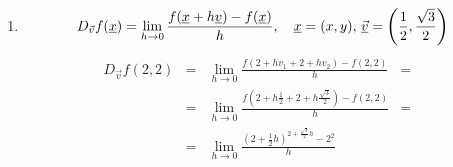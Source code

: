 \begin{example}
\begin{enumerate}
		\paragraph{Intermezzo:} Vedere Proposizione \ref{prop:f_diff_continua}. Se una funzione è differenziabile allora esiste una formula esplicita che permette di calcolare la derivata direzionale. $\qed$.
		\item
		\begin{equation*}
			D_{\vec v} f(\uline x) = \lim_{h\rightarrow 0}\frac{f(\uline x + h \uline v) - f(\uline x)}{h},\quad \uline x=(x,y),\, \uline{\vec v} = \left(\frac{1}{2}, \frac{\sqrt{3}}{2}\right)
		\end{equation*}
		\begin{equation}\label{eq:esempio_derivata_direzionale_2,2}
			\begin{matrix}
				D_{\vec v} f(2,2) &=& \lim\limits_{h\rightarrow 0}\frac{f(2+hv_1 + 2+hv_2) - f(2,2)}{h} &=& \\
				&=&\lim\limits_{h\rightarrow 0}\frac{f(2+h\frac{1}{2} + 2+h\frac{\sqrt3}{2}) - f(2,2)}{h} &=& \\
				&=&\lim\limits_{h\rightarrow 0}\frac{\left(2+\frac{1}{2}h\right)^{2+\frac{\sqrt{3}}{2}h}-2^2}{h}
			\end{matrix}
		\end{equation}

\end{enumerate}
\end{example}
